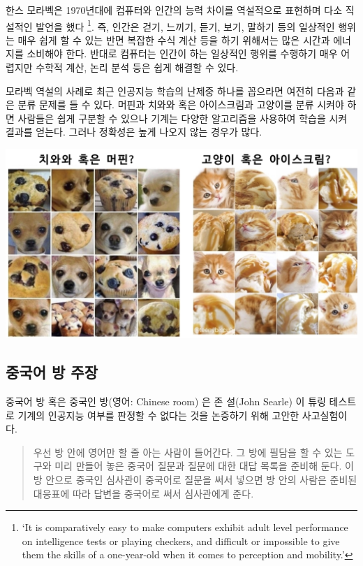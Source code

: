 \documentclass[smallextended]{svjour3}       %
\begin{document}
한스 모라벡은 1970년대에 컴퓨터와 인간의 능력 차이를 역설적으로 표현하며
다소 직설적인 발언을 했다 \footnote{`It is comparatively easy to make
  computers exhibit adult level performance on intelligence tests or
  playing checkers, and difficult or impossible to give them the skills
  of a one-year-old when it comes to perception and mobility.'}. 즉,
인간은 걷기, 느끼기, 듣기, 보기, 말하기 등의 일상적인 행위는 매우 쉽게
할 수 있는 반면 복잡한 수식 계산 등을 하기 위해서는 많은 시간과 에너지를
소비해야 한다. 반대로 컴퓨터는 인간이 하는 일상적인 행위를 수행하기 매우
어렵지만 수학적 계산, 논리 분석 등은 쉽게 해결할 수 있다.

모라벡 역설의 사례로 최근 인공지능 학습의 난제중 하나를 꼽으라면 여전히
다음과 같은 분류 문제를 들 수 있다. 머핀과 치와와 혹은 아이스크림과
고양이를 분류 시켜야 하면 사람들은 쉽게 구분할 수 있으나 기계는 다양한
알고리즘을 사용하여 학습을 시켜 결과를 얻는다. 그러나 정확성은 높게
나오지 않는 경우가 많다.

\begin{center}\includegraphics[width=1\linewidth]{fig/moravec-paradox} \end{center}

\hypertarget{chinese-room}{%
\subsection{중국어 방 주장}\label{chinese-room}}

중국어 방 혹은 중국인 방(영어: Chinese room) \cite{wikipedia_2019}은 존
설(John Searle) 이 튜링 테스트로 기계의 인공지능 여부를 판정할 수 없다는
것을 논증하기 위해 고안한 사고실험이다.

\begin{quote}
우선 방 안에 영어만 할 줄 아는 사람이 들어간다. 그 방에 필담을 할 수
있는 도구와 미리 만들어 놓은 중국어 질문과 질문에 대한 대답 목록을
준비해 둔다. 이 방 안으로 중국인 심사관이 중국어로 질문을 써서 넣으면 방
안의 사람은 준비된 대응표에 따라 답변을 중국어로 써서 심사관에게 준다.
\end{quote}
\end{document}
